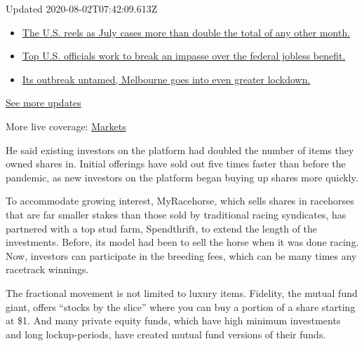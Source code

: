 Updated 2020-08-02T07:42:09.613Z

\begin{itemize}
\tightlist
\item
  \href{https://www.nytimes.com/2020/08/01/world/coronavirus-covid-19.html?action=click\&pgtype=Article\&state=default\&region=MAIN_CONTENT_1\&context=storylines_live_updates\#link-34047410}{The
  U.S. reels as July cases more than double the total of any other
  month.}
\item
  \href{https://www.nytimes.com/2020/08/01/world/coronavirus-covid-19.html?action=click\&pgtype=Article\&state=default\&region=MAIN_CONTENT_1\&context=storylines_live_updates\#link-780ec966}{Top
  U.S. officials work to break an impasse over the federal jobless
  benefit.}
\item
  \href{https://www.nytimes.com/2020/08/01/world/coronavirus-covid-19.html?action=click\&pgtype=Article\&state=default\&region=MAIN_CONTENT_1\&context=storylines_live_updates\#link-2bc8948}{Its
  outbreak untamed, Melbourne goes into even greater lockdown.}
\end{itemize}

\href{https://www.nytimes.com/2020/08/01/world/coronavirus-covid-19.html?action=click\&pgtype=Article\&state=default\&region=MAIN_CONTENT_1\&context=storylines_live_updates}{See
more updates}

More live coverage:
\href{https://www.nytimes.com/live/2020/07/31/business/stock-market-today-coronavirus?action=click\&pgtype=Article\&state=default\&region=MAIN_CONTENT_1\&context=storylines_live_updates}{Markets}

He said existing investors on the platform had doubled the number of
items they owned shares in. Initial offerings have sold out five times
faster than before the pandemic, as new investors on the platform began
buying up shares more quickly.

To accommodate growing interest, MyRacehorse, which sells shares in
racehorses that are far smaller stakes than those sold by traditional
racing syndicates, has partnered with a top stud farm, Spendthrift, to
extend the length of the investments. Before, its model had been to sell
the horse when it was done racing. Now, investors can participate in the
breeding fees, which can be many times any racetrack winnings.

The fractional movement is not limited to luxury items. Fidelity, the
mutual fund giant, offers ``stocks by the slice'' where you can buy a
portion of a share starting at \$1. And many private equity funds, which
have high minimum investments and long lockup-periods, have created
mutual fund versions of their funds.


